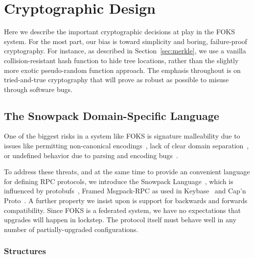 
\section{Cryptographic Design}
\label{sec:crypto}

Here we describe the important cryptographic decisions at play in the FOKS
system.  For the most part, our bias is toward simplicity and boring,
failure-proof cryptography.  For instance, as described in
Section~\ref{sec:merkle}, we use a vanilla collision-resistant hash function to
hide tree locations, rather than the slightly more exotic pseudo-random function
approach. The emphasis throughout is on tried-and-true cryptography that will
prove as robust as possible to misuse through software bugs.

\subsection{The Snowpack Domain-Specific Language}

One of the biggest risks in a system like FOKS is signature malleability
due to issues like permitting non-canonical encodings~\cite{conf/crypto/Bleichenbacher98,bip66}, 
lack of clear domain separation~\cite{ncc2019,cryptoeprint:2020/241}, 
or undefined behavior due to parsing and encoding bugs~\cite{heartbleed2014durumeric}.

To address these threats, and at the same time to provide an convenient language for 
defining RPC protocols, we introduce the Snowpack Language~\cite{snowpack}, which is influenced
by protobufs~\cite{protobuf}, Framed Msgpack-RPC as used in Keybase~\cite{keybase}
and Cap'n Proto~\cite{capnproto}. A further property we insist upon is support
for backwards and forwards compatibility. Since FOKS is a federated system, we have 
no expectations that upgrades will happen in lockstep. The protocol itself must behave
well in any number of partially-upgraded configurations.

\subsubsection{Structures}
\label{sec:snowpack-structures}

